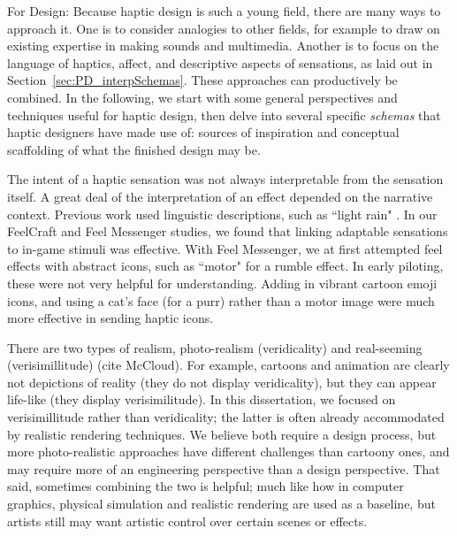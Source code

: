 For Design:
Because haptic design is such a young field, there are many ways to approach it.
One is to consider analogies to other fields, for example to draw on existing expertise in making sounds and multimedia.
Another is to focus on the language of haptics, affect, and descriptive aspects of sensations, as laid out in Section~\ref{sec:PD_interpSchemas}. 
These approaches can productively be combined.
In the following, we start with some general perspectives and techniques useful for haptic design, then delve into several specific \textit{schemas} that haptic designers have made use of: 
sources of inspiration and conceptual scaffolding of what the finished design may be.


The intent of a haptic sensation was not always interpretable from the sensation itself.
A great deal of the interpretation of an effect depended on the narrative context.
Previous work used linguistic descriptions, such as ``light rain" \cite{Israr2014}.
In our FeelCraft and Feel Messenger studies, we found that linking adaptable sensations to in-game stimuli was effective.
With Feel Messenger, we at first attempted feel effects with abstract icons, such as ``motor" for a rumble effect. 
In early piloting, these were not very helpful for understanding.
Adding in vibrant cartoon emoji icons, and using  a cat's face (for a purr) rather than a motor image were much more effective in sending haptic icons.


There are two types of realism, photo-realism (veridicality) and real-seeming (verisimillitude) (cite McCloud).
For example, cartoons and animation are clearly not depictions of reality (they do not display veridicality), but they can appear life-like (they display verisimilitude).
In this dissertation, we focused on verisimillitude rather than veridicality; the latter is often already accommodated by realistic rendering techniques.
We believe both require a design process, but more photo-realistic approaches have different challenges than cartoony ones, and may require more of an engineering perspective than a design perspective.
That said, sometimes combining the two is helpful; much like how in computer graphics, physical simulation and realistic rendering are used as a baseline, but artists still may want artistic control over certain scenes or effects.




